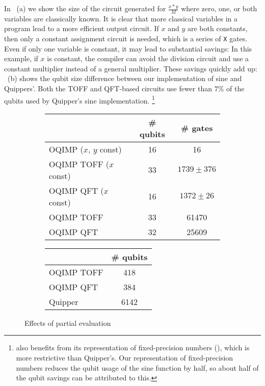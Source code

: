 In ~(a) we show the size of the circuit generated for $\frac{x*y}{M}$ where zero, one, or both variables are classically known. 
It is clear that more classical variables in a program lead to a more efficient output circuit.
If $x$ and $y$ are both constants, then only a constant assignment circuit is needed, which is a series of \texttt{X} gates. 
Even if only one variable is constant, it may lead to substantial savings: In this example, if $x$ is constant, the compiler can avoid the division circuit and use a constant multiplier instead of a general multiplier.
These savings quickly add up: ~(b) shows the qubit size difference between our implementation of sine and Quippers'. Both the TOFF and QFT-based circuits use fewer than $7\%$ of the qubits used by Quipper's sine implementation.
\footnote{\vqimp also benefits from its representation of fixed-precision numbers (), which is more restrictive than Quipper's. Our representation of fixed-precision numbers reduces the qubit usage of the sine function by half, so about half of the qubit savings can be attributed to this.}

\begin{figure}[t]
{\small
\begin{subfigure}[b]{.6\textwidth}
\centering
\begin{tabular}{| l | c | c |}
\hline
                     & \# qubits  & \# gates   \\
                     \hline
OQIMP ($x$, $y$ const) & 16 & 16\\
OQIMP TOFF ($x$ const) & 33 & $1739 \pm 376$ \\
OQIMP QFT ($x$ const) & 16 & $1372 \pm 26$ \\
OQIMP TOFF & 33 & 61470   \\
OQIMP QFT & 32  & 25609  \\
\hline                           
\end{tabular}
\end{subfigure}
\hfill
\begin{subfigure}[b]{.35\textwidth}
\centering
\begin{tabular}{| l | c|}
\hline
                     & \# qubits   \\
                     \hline
OQIMP TOFF & 418   \\
OQIMP QFT & 384  \\
Quipper & 6142  \\
\hline                           
\end{tabular}
\end{subfigure}
}
\caption{Effects of partial evaluation}
\label{fig:self-data}
\end{figure}

